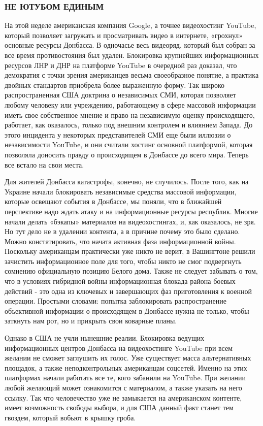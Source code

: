 \subsubsection{НЕ ЮТУБОМ ЕДИНЫМ}

На этой неделе американская компания Google, а точнее видеохостинг YouTube,
который позволяет загружать и просматривать видео в интернете, «грохнул»
основные ресурсы Донбасса. В одночасье весь видеоряд, который был собран за все
время противостояния был удален. Блокировка крупнейших информационных ресурсов
ЛНР и ДНР на платформе YouTube в очередной раз доказал, что демократия с точки
зрения американцев весьма своеобразное понятие, а практика двойных стандартов
приобрела более выраженную форму. Так широко распространенная США доктрина о
независимых СМИ, которая позволяет любому человеку или учреждению, работающему
в сфере массовой информации иметь свое собственное мнение и право на
независимую оценку происходящего, работает, как оказалось, только под внешним
контролем и влиянием Запада. До этого инцидента у некоторых представителей СМИ
еще были иллюзии о независимости YouTube, и они считали хостинг основной
платформой, которая позволяла доносить правду о происходящем в Донбассе до
всего мира. Теперь все встало на свои места.

Для жителей Донбасса катастрофы, конечно, не случилось. После того, как на
Украине начали блокировать независимые средства массовой информации, которые
освещают события в Донбассе, мы поняли, что в ближайшей перспективе надо ждать
атаку и на информационные ресурсы республик. Многие начали делать «бэкапы»
материалов на видеохостингах, и, как оказалось, не зря. Но тут дело не в
удалении контента, а в причине почему это было сделано. Можно констатировать,
что начата активная фаза информационной войны. Поскольку американцам
практически уже никто не верит, в Вашингтоне решили зачистить информационное
поле для того, чтобы никто не смог подвергнуть сомнению официальную позицию
Белого дома. Также не следует забывать о том, что в условиях гибридной войны
информационная блокада района боевых действий - это одна из ключевых и
завершающих фаз приготовления к военной операции. Простыми словами: попытка
заблокировать распространение объективной информации о происходящем в Донбассе
нужна не только, чтобы заткнуть нам рот, но и прикрыть свои коварные планы.

Однако в США не учли нынешние реалии. Блокировка ведущих информационных центров
Донбасса на видеохостинге YouTube при всем желании не сможет заглушить их
голос. Уже существует масса альтернативных площадок, а также неподконтрольных
американцам соцсетей. Именно на этих платформах начали работать все те, кого
забанили на YouTube. При желании любой желающий может ознакомится с материалом,
а также указать на него ссылку. Так что человечество уже не замыкается на
американском контенте, имеет возможность свободы выбора, и для США данный факт
станет тем гвоздем, который вобьют в крышку гроба.
